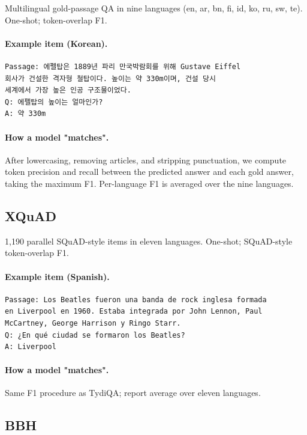 Multilingual gold-passage QA in nine languages (en, ar, bn, fi, id,
ko, ru, sw, te). One-shot; token-overlap F1.

\paragraph{Example item (Korean).}
\begin{verbatim}
Passage: 에펠탑은 1889년 파리 만국박람회를 위해 Gustave Eiffel
회사가 건설한 격자형 철탑이다. 높이는 약 330m이며, 건설 당시
세계에서 가장 높은 인공 구조물이었다.
Q: 에펠탑의 높이는 얼마인가?
A: 약 330m
\end{verbatim}

\paragraph{How a model "matches".} After lowercasing, removing
articles, and stripping punctuation, we compute token precision and
recall between the predicted answer and each gold answer, taking
the maximum F1. Per-language F1 is averaged over the nine
languages.

\subsection{XQuAD}
\label{app:ex-xquad}

1{,}190 parallel SQuAD-style items in eleven languages. One-shot;
SQuAD-style token-overlap F1.

\paragraph{Example item (Spanish).}
\begin{verbatim}
Passage: Los Beatles fueron una banda de rock inglesa formada
en Liverpool en 1960. Estaba integrada por John Lennon, Paul
McCartney, George Harrison y Ringo Starr.
Q: ¿En qué ciudad se formaron los Beatles?
A: Liverpool
\end{verbatim}

\paragraph{How a model "matches".} Same F1 procedure as TydiQA;
report average over eleven languages.

\subsection{BBH}
\label{app:ex-bbh}

